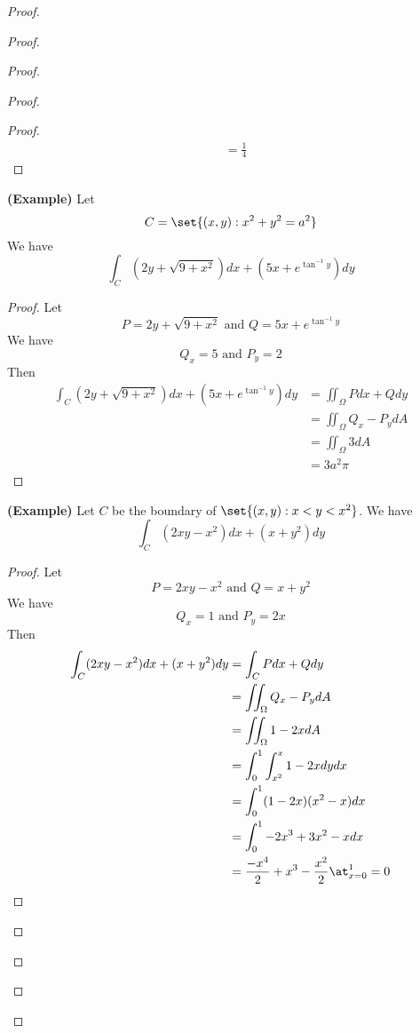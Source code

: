 \documentclass{report}
\begin{document}
\begin{proof}
\begin{proof}
\begin{proof}
\begin{proof}
\begin{proof}
\begin{align*}
&=\frac{1}{4}
\end{align*}
\end{proof}
\begin{theorem}
\label{9.3.13}
\textbf{(Example)} Let 
\begin{equation*}
C=\set{(x,y):x^2+y^2=a^2}
\end{equation*}
We have
\begin{equation*}
\int_C (2y+\sqrt{9+x^2} )dx+(5x+e^{\tan^{-1}y})dy
\end{equation*}
\end{theorem}
\begin{proof}
Let 
\begin{equation*}
P=2y+\sqrt{9+x^2}\text{ and }Q=5x+e^{\tan^{-1} y} 
\end{equation*}
We have
\begin{equation*}
Q_x=5\text{ and }P_y=2
\end{equation*}
Then
\begin{align*}
\int_C (2y+\sqrt{9+x^2} )dx+(5x+e^{\tan^{-1}y})dy&=\iint_{\Omega} Pdx+Qdy\\
&=\iint_\Omega Q_x-P_y dA\\
&=\iint_{\Omega}3dA\\
&=3a^2\pi
\end{align*}
\end{proof}
\begin{theorem}
\label{9.3.14}
\textbf{(Example)}
Let $C$ be the boundary of  $\set{(x,y):x<y<x^2}$. We have
\begin{equation*}
\int_C (2xy-x^2)dx+(x+y^2)dy
\end{equation*}
\end{theorem}
\begin{proof}
Let
\begin{equation*}
P=2xy-x^2\text{ and }Q=x+y^2
\end{equation*}
We have
\begin{equation*}
Q_x=1\text{ and }P_y=2x
\end{equation*}
Then
\begin{align*}
\int_C (2xy-x^2)dx+(x+y^2)dy&=\int_C Pdx+Qdy\\
&=\iint_\Omega Q_x-P_y dA\\
&=\iint_\Omega 1-2x dA\\
&=\int_0^1\int_{x^2}^{x} 1-2x dydx\\
&=\int_0^1 (1-2x)(x^2-x)dx\\
&=\int_0^1 -2x^3+3x^2-xdx\\
&=\frac{-x^4}{2}+x^3 -\frac{x^2}{2}\at_{x=0}^1=0

\end{align*}
\end{proof}
\end{proof}
\end{proof}
\end{proof}
\end{proof}
\end{document}
